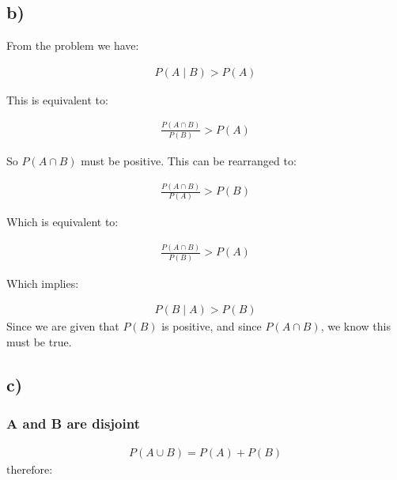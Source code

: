 \documentclass[11pt]{article}
\begin{document}
\subsection*{b)}
\label{sec:org89b8435}

From the problem we have:

\begin{equation}
\begin{align}
P(A\mid B) > P(A)
\end{align}
\end{equation}

This is equivalent to:

\begin{equation}
\begin{align}
  \frac{P(A \cap B)}{P(B)} > P(A)
\end{align}
\end{equation}

So \(P(A \cap B)\) must be positive. This can be rearranged to: 

\begin{equation}
\begin{align}
  \frac{P(A \cap B)}{P(A)} > P(B)
\end{align}
\end{equation}

Which is equivalent to:

\begin{equation}
\begin{align}
  \frac{P(A \cap B)}{P(B)} > P(A)
\end{align}
\end{equation}

Which implies:

\begin{equation}
\begin{align}
P(B\mid A) > P(B)
\end{align}
\end{equation}
Since we are given that \(P(B)\) is positive, and since \(P(A \cap B)\), we know this must be true.

\subsection*{c)}
\label{sec:orgb0e8e24}
\subsubsection*{A and B are disjoint}
\label{sec:org4c44328}
\begin{equation}
\begin{align}
 P(A \cup B) = P(A) + P(B)
\end{align}
\end{equation}
$\text{therefore:}$\\
\end{document}
